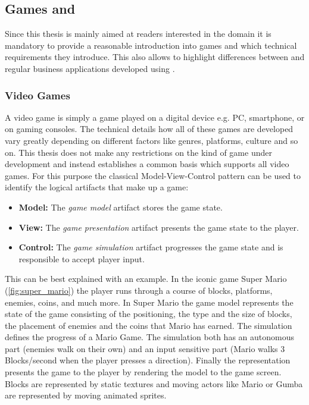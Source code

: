 \subsection{Games and \ogsucuc{}}
\label{sub:games}

Since this thesis is mainly aimed at readers interested in the \ms{} domain it
is mandatory to provide a reasonable introduction into games and which technical
requirements they introduce. This also allows to highlight differences between
\ogs{} and regular business applications developed using \mss{}.

\subsubsection{Video Games}

A video game is simply a game played on a digital device e.g. PC, smartphone, or
on gaming consoles. The technical details how all of these games are developed
vary greatly depending on different factors like genres, platforms, culture
and so on. This thesis does not make any restrictions on the kind of game
under development and instead establishes a common basis which supports all
video games. For this purpose the classical Model-View-Control pattern can be
used to identify the logical artifacts that make up a game: 

\begin{itemize}
  \item \textbf{Model:} The \textit{game model} artifact stores the game state.
  \item \textbf{View:} The \textit{game presentation} artifact presents the game
  state to the player.
  \item \textbf{Control:} The \textit{game simulation} artifact progresses the
  game state and is responsible to accept player input.
\end{itemize}

This can be best explained with an example. In the iconic game Super Mario
(\autoref{fig:super_mario}) the player runs through a course of blocks,
platforms, enemies, coins, and much more. In Super Mario the game model
represents the state of the game consisting of the positioning, the type and the
size of blocks, the placement of enemies and the coins that Mario has earned.
The simulation defines the progress of a Mario Game. The simulation both has an
autonomous part (enemies walk on their own) and an input sensitive part (Mario
walks 3 Blocks/second when the player presses a direction). Finally the
representation presents the game to the player by rendering the model to the
game screen. Blocks are represented by static textures and moving actors like
Mario or Gumba are represented by moving animated \glspl{sprite}.

